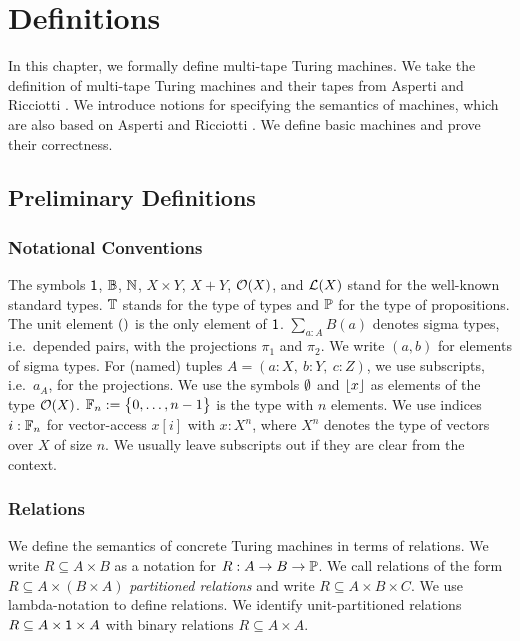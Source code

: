 \chapter{Definitions}
\label{chap:definitions}

In this chapter, we formally define multi-tape Turing machines.  We take the definition of multi-tape Turing machines and their tapes from Asperti and
Ricciotti \cite{asperti2015}.  We introduce notions for specifying the semantics of machines, which are also based on Asperti and Ricciotti
\cite{asperti2015}.  We define basic machines and prove their correctness.

\section{Preliminary Definitions}
\label{sec:prelim}


\subsection{Notational Conventions}
\label{sec:notational-conventions}

The symbols $\mathsf{1}$, $\mathbb{B}$, $\mathbb{N}$, $X \times Y$, $X + Y$, $\mathcal{O}(X)$, and $\mathcal{L}(X)$ stand for the well-known standard types.  $\mathbb{T}$ stands for
the type of types and $\mathbb{P}$ for the type of propositions.  The unit element $\mathsf{()}$ is the only element of $\mathsf{1}$.  $\sum_{a:A} B(a)$ denotes sigma
types, i.e.\ depended pairs, with the projections $\pi_1$ and $\pi_2$.  We write $(a,b)$ for elements of sigma types.  For (named) tuples
$A = (a:X,~b:Y,~c:Z)$, we use subscripts, i.e.\ $a_A$, for the projections.  We use the symbols $\emptyset$ and $\left\lfloor {x} \right\rfloor$ as elements of the type
$\mathcal{O}(X)$.  $\mathbb{F}_n := \bigl\{ 0, \dots, n-1 \bigr \}$ is the type with $n$ elements.  We use indices $i:\mathbb{F}_n$ for vector-access $x[i]$ with $x:X^n$,
where $X^n$ denotes the type of vectors over $X$ of size $n$.  We usually leave subscripts out if they are clear from the context.


\subsection{Relations}
\label{sec:relations}

We define the semantics of concrete Turing machines in terms of relations.  We write $R \subseteq A \times B$ as a notation for
$R : A \rightarrow B \rightarrow \mathbb{P}$.  We call relations of the form $R \subseteq A \times (B \times A)$ \emph{partitioned relations} and write
$R \subseteq A \times B \times C$.  We use lambda-notation to define relations.  We identify unit-partitioned relations
$R \subseteq A \times \mathsf{1} \times A$ with binary relations $R \subseteq A \times A$.

